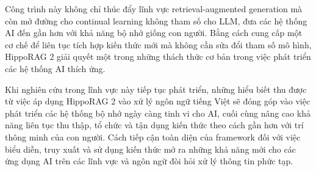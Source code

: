 \documentclass[../main.tex]{subfiles}
\begin{document}
Công trình này không chỉ thúc đẩy lĩnh vực retrieval-augmented generation mà còn mở đường cho continual learning không tham số cho LLM, đưa các hệ thống AI đến gần hơn với khả năng bộ nhớ giống con người. Bằng cách cung cấp một cơ chế để liên tục tích hợp kiến thức mới mà không cần sửa đổi tham số mô hình, HippoRAG 2 giải quyết một trong những thách thức cơ bản trong việc phát triển các hệ thống AI thích ứng.

Khi nghiên cứu trong lĩnh vực này tiếp tục phát triển, những hiểu biết thu được từ việc áp dụng HippoRAG 2 vào xử lý ngôn ngữ tiếng Việt sẽ đóng góp vào việc phát triển các hệ thống bộ nhớ ngày càng tinh vi cho AI, cuối cùng nâng cao khả năng liên tục thu thập, tổ chức và tận dụng kiến thức theo cách gần hơn với trí thông minh của con người. Cách tiếp cận toàn diện của framework đối với việc biểu diễn, truy xuất và sử dụng kiến thức mở ra những khả năng mới cho các ứng dụng AI trên các lĩnh vực và ngôn ngữ đòi hỏi xử lý thông tin phức tạp.
\end{document}
